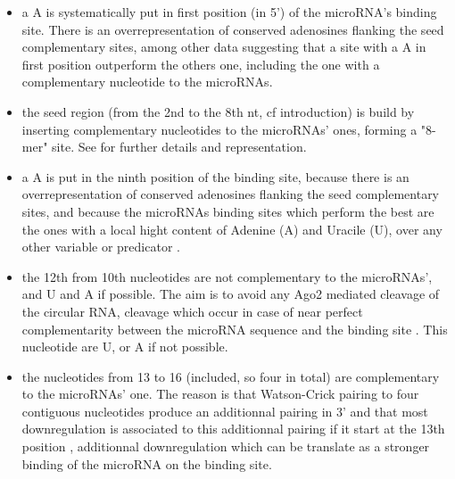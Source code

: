 \documentclass[a4paper,12pt]{report}
\begin{document}
\begin{itemize}
	\item a A is systematically put in first position (in 5') of the microRNA's binding site. There is an overrepresentation of conserved adenosines flanking the seed complementary sites\cite{Aanchor}, among other data suggesting that a site with a A in first position outperform the others one, including the one with a complementary nucleotide to the microRNAs\cite{Urich}. 
	
	\item the seed region (from the 2nd to the 8th nt, cf introduction) is build by inserting complementary nucleotides to the microRNAs' ones, forming a "8-mer" site. See \cite{Urich, site} for further details and representation.
	
	\item a A is put in the ninth position of the binding site, because there is an overrepresentation of conserved adenosines flanking the seed complementary sites\cite{Aanchor}, and because the microRNAs binding sites which perform the best are the ones with a local hight content of Adenine (A) and Uracile (U), over any other variable or predicator \cite{Urich}.
	
	\item the 12th from 10th nucleotides are not complementary to the microRNAs', and U and A if possible. The aim is to avoid any Ago2 mediated cleavage of the circular RNA, cleavage which occur in case of near perfect complementarity between the microRNA sequence and the binding site \cite{cancer}. This nucleotide are U, or A if not possible.
	
	\item the nucleotides from 13 to 16 (included, so four in total) are complementary to the \-microRNAs' one. The reason is that Watson-Crick pairing to four contiguous nucleotides produce an additionnal pairing in 3'\cite{site} and that most downregulation is associated to this additionnal pairing if it start at the 13th position \cite{site}, additionnal downregulation which can be translate as a stronger binding of the microRNA on the binding site\cite{site}.
	
\end{itemize}
\end{document}
